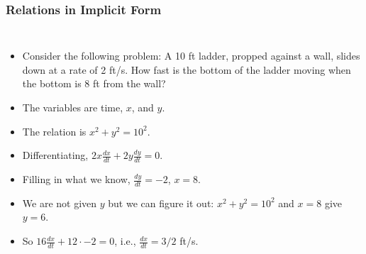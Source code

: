 \documentclass[serif,ignorenonframetext]{beamer}
\newcommand{\ds}{\displaystyle}
\begin{document}
\begin{frame}
  \frametitle{Relations in Implicit Form}
  \begin{columns}
  \begin{itemize}
  \item<1-> Consider the following problem: A 10 ft ladder,
    propped against a wall, slides down
    at a rate of 2 ft/s.  How fast is the bottom of the ladder moving when 
    the bottom is 8 ft from the wall?
  \item<7-> The variables are time, $x$, and $y$.
  \item<8-> The relation is $x^2+y^2=10^2$.
  \item<9-> Differentiating, $\ds 2x \frac{dx}{dt} + 2y \frac{dy}{dt} = 0$.
  \item<10-> Filling in what we know, $\ds \frac{dy}{dt} = -2$, $x=8$.  
  \item<11-> We are not given $y$ but we can figure it out: $x^2+y^2=10^2$
    and $x=8$ give $y=6$.
  \item<12-> So $\ds 16 \frac{dx}{dt} + 12 \cdot -2 = 0$, i.e.,
    $\ds \frac{dx}{dt}=3/2$ ft/s.
  \end{itemize}

\end{columns}
\end{frame}
\end{document}
